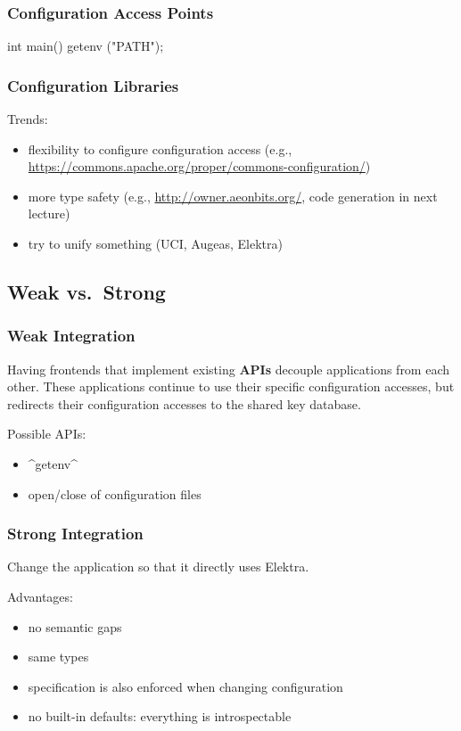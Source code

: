 \begin{frame}[fragile]
	\frametitle{Configuration Access Points}

	\begin{code}[language=Cpp,gobble=4,showspaces=no]
	int main()
	{
		getenv ("PATH");
	}
	\end{code}
\end{frame}

\begin{frame}[fragile]
	\frametitle{Configuration Libraries}

	Trends:
	\begin{itemize}[<+-| alert@+>]
	\item flexibility to configure configuration access (e.g., \url{https://commons.apache.org/proper/commons-configuration/})
	\item more type safety (e.g., \url{http://owner.aeonbits.org/}, code generation in next lecture)
	\item try to unify something (UCI, Augeas, Elektra)
	\end{itemize}
\end{frame}

\subsection{Weak vs.\ Strong}

\begin{frame}[fragile]
	\frametitle{Weak Integration}

	Having frontends that implement existing \textbf{APIs} decouple applications from each other.
	These applications continue to use their specific configuration accesses, but \elektra{} redirects their configuration accesses to the shared key database.

	Possible APIs:
	\begin{itemize}[<+-| alert@+>]
	\item ^getenv^
	\item open/close of configuration files
	\end{itemize}
\end{frame}

\begin{frame}[fragile]
	\frametitle{Strong Integration}

	Change the application so that it directly uses Elektra.

	Advantages:
	\begin{itemize}[<+-| alert@+>]
	\item no semantic gaps
	\item same types
	\item specification is also enforced when changing configuration
	\item no built-in defaults: everything is introspectable
	\end{itemize}
\end{frame}

\nocite{raab2017introducing}

\appendix

\begin{frame}[allowframebreaks]
	
	
\end{frame}




